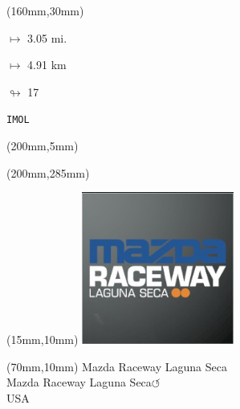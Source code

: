 \begin{textblock*}{40mm}(160mm,30mm)%
\Large
\par$\mapsto$ 3.05 mi.
\par$\mapsto$ 4.91 km
\par$\looparrowright$ 17
\par\hfill\tiny\tt IMOL\\
\end{textblock*}
\begin{textblock*}{20mm}(200mm,5mm)%
\fbox{\thepage}
\label{IMOL}
\end{textblock*}
\begin{textblock*}{20mm}(200mm,285mm)%
\fbox{\thepage}
\end{textblock*}

\null\newpage
\begin{textblock*}{50mm}(15mm,10mm)%
\includegraphics[width=50mm]{LG/2015-05-20_00085.png}
\end{textblock*}
\begin{textblock*}{130mm}(70mm,10mm)%
{\fontsize{20}{20}\selectfont Mazda Raceway Laguna Seca\\}
{\fontsize{16}{16}\selectfont Mazda Raceway Laguna Seca\hfill \Large$\circlearrowleft$\\}
{\fontsize{12}{12}\selectfont USA\\}
\end{textblock*}
